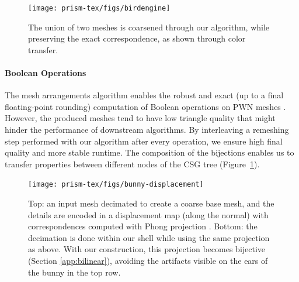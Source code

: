 

\begin{figure}
    \centering
    \texttt{[image: prism-tex/figs/birdengine]}
    \caption{The union of two meshes is coarsened through our algorithm, while preserving the exact correspondence, as shown through color transfer.}
    \label{prism:fig:birdengine}
    
\end{figure}

\paragraph{Boolean Operations}
The mesh arrangements algorithm enables the robust and exact (up to a final floating-point rounding) computation of Boolean operations on PWN meshes \cite{zhou2016mesh}. 
However, the produced meshes tend to have low triangle quality that might hinder the performance of {downstream} algorithms. %
By interleaving a remeshing step performed with our algorithm after every operation, we ensure  high final quality and more stable runtime. The composition of the bijections enables us to transfer properties between different nodes of the CSG tree (Figure~\ref{prism:fig:birdengine}).%


\begin{figure}
    \centering
    \texttt{[image: prism-tex/figs/bunny-displacement]}
    \caption{Top: an input mesh decimated to create a coarse base mesh, and the details are encoded in a displacement map (along the normal) with correspondences computed with Phong projection \cite{kobbelt1998interactive}. Bottom: the decimation is done within our shell while using the same projection as above. With our construction, this projection becomes bijective (Section \ref{app:bilinear}), avoiding the artifacts visible on the ears of  the bunny in the top row.}
    \label{prism:fig:displacement-mapping}
    
\end{figure}
